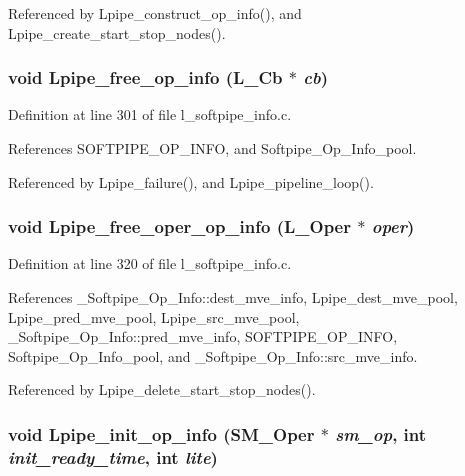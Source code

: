 Referenced by Lpipe\_\-construct\_\-op\_\-info(), and Lpipe\_\-create\_\-start\_\-stop\_\-nodes().
\subsubsection{\setlength{\rightskip}{0pt plus 5cm}void Lpipe\_\-free\_\-op\_\-info (L\_\-Cb $\ast$ {\em cb})}\label{l__softpipe__info_8c_62ce42282a593806d185df143094a321}




Definition at line 301 of file l\_\-softpipe\_\-info.c.

References SOFTPIPE\_\-OP\_\-INFO, and Softpipe\_\-Op\_\-Info\_\-pool.

Referenced by Lpipe\_\-failure(), and Lpipe\_\-pipeline\_\-loop().
\subsubsection{\setlength{\rightskip}{0pt plus 5cm}void Lpipe\_\-free\_\-oper\_\-op\_\-info (L\_\-Oper $\ast$ {\em oper})}\label{l__softpipe__info_8c_070ce57374be3f0dd0db1e026e5f019c}




Definition at line 320 of file l\_\-softpipe\_\-info.c.

References \_\-Softpipe\_\-Op\_\-Info::dest\_\-mve\_\-info, Lpipe\_\-dest\_\-mve\_\-pool, Lpipe\_\-pred\_\-mve\_\-pool, Lpipe\_\-src\_\-mve\_\-pool, \_\-Softpipe\_\-Op\_\-Info::pred\_\-mve\_\-info, SOFTPIPE\_\-OP\_\-INFO, Softpipe\_\-Op\_\-Info\_\-pool, and \_\-Softpipe\_\-Op\_\-Info::src\_\-mve\_\-info.

Referenced by Lpipe\_\-delete\_\-start\_\-stop\_\-nodes().
\subsubsection{\setlength{\rightskip}{0pt plus 5cm}void Lpipe\_\-init\_\-op\_\-info (\bf{SM\_\-Oper} $\ast$ {\em sm\_\-op}, int {\em init\_\-ready\_\-time}, int {\em lite})}\label{l__softpipe__info_8c_a1f243509717138e72fffec354e493a4}





